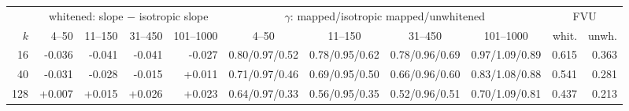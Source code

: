 \begin{tabular}{r rrrr cccc rr}
\toprule
 & \multicolumn{4}{c}{whitened: slope $-$ isotropic slope} & \multicolumn{4}{c}{$\gamma$: mapped/isotropic mapped/unwhitened} & \multicolumn{2}{c}{FVU} \\
\cmidrule(lr){2-5}\cmidrule(lr){6-9}\cmidrule(lr){10-11}
$k$ & 4--50 & 11--150 & 31--450 & 101--1000 & 4--50 & 11--150 & 31--450 & 101--1000 & whit. & unwh. \\
\midrule
16 & -0.036 & -0.041 & -0.041 & -0.027 & 0.80/0.97/0.52 & 0.78/0.95/0.62 & 0.78/0.96/0.69 & 0.97/1.09/0.89 & 0.615 & 0.363 \\
40 & -0.031 & -0.028 & -0.015 & +0.011 & 0.71/0.97/0.46 & 0.69/0.95/0.50 & 0.66/0.96/0.60 & 0.83/1.08/0.88 & 0.541 & 0.281 \\
128 & +0.007 & +0.015 & +0.026 & +0.023 & 0.64/0.97/0.33 & 0.56/0.95/0.35 & 0.52/0.96/0.51 & 0.70/1.09/0.81 & 0.437 & 0.213 \\
\bottomrule
\end{tabular}

